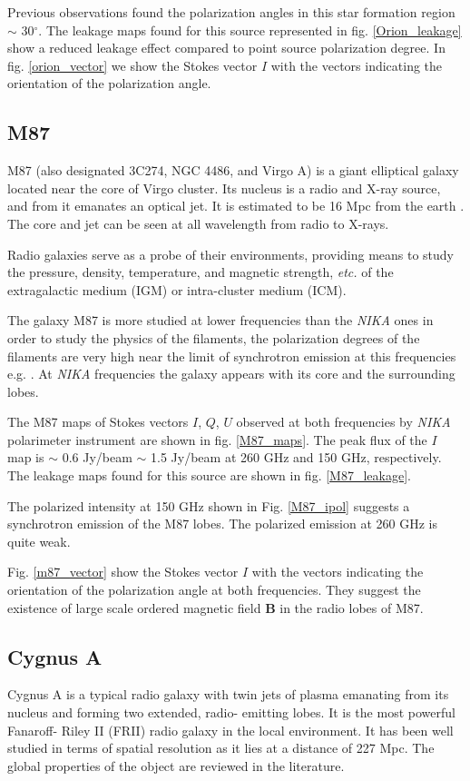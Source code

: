 \documentclass[twocolumn,traditabstract]{aa}
\begin{document}
Previous observations \citep{polka_apex} found the polarization angles in this star formation region $\sim$ 30$^\circ$.
The leakage maps found for this source represented in fig. \ref{Orion_leakage} show a reduced leakage effect compared to point source polarization degree. In fig. \ref{orion_vector} we show the Stokes vector $I$ with the vectors indicating the orientation of the polarization angle.

 
\subsection{M87}
M87 (also designated 3C274, NGC 4486, and Virgo A) is a giant
elliptical galaxy \citep{dev76} located near the 
core of Virgo cluster. 
Its nucleus is a radio and X-ray source, and from it emanates an
optical jet. It is estimated to be 16 Mpc from the earth \citep{mou80}. The core and jet can be seen at all wavelength 
from radio to X-rays.

Radio galaxies serve as a probe of their environments, providing means
to study the pressure, density, temperature, and magnetic strength, {\it
etc.} of the extragalactic medium (IGM) or intra-cluster
medium (ICM). 

The galaxy M87 is more studied at lower frequencies than the {\it NIKA} ones in order to study the physics of the filaments, the polarization 
degrees of the filaments are very high near the limit of synchrotron 
emission at this frequencies e.g. \citep{pac70}. At {\it NIKA} frequencies the galaxy appears with its core and the surrounding lobes. 

The M87 maps of Stokes vectors $I$, $Q$, $U$ observed at both frequencies by {\it NIKA} polarimeter instrument are shown in fig. \ref{M87_maps}. The peak flux of the $I$ map is $\sim$ 0.6 Jy/beam $\sim$ 1.5 Jy/beam at 260 GHz and 150 GHz, respectively. The leakage maps found for this source are shown in fig. \ref{M87_leakage}. 

The polarized intensity at 150 GHz shown in Fig. \ref{M87_ipol} suggests a synchrotron emission of the M87 lobes.  The polarized emission at 260 GHz is quite weak. 

 Fig. \ref{m87_vector} show the Stokes vector $I$ with the vectors indicating the orientation of the polarization angle at both frequencies.  They suggest the existence of  large scale ordered magnetic field {\bf B} in the radio lobes of M87.

\subsection{Cygnus A}
Cygnus A is a typical radio galaxy with twin jets of plasma emanating from its nucleus and forming two extended, radio- emitting lobes. 
It is  the most powerful Fanaroff- Riley II (FRII) radio galaxy in the local environment.
It has been well studied in terms of spatial resolution as it lies
at a distance of 227 Mpc. The global properties of the object are
reviewed in the literature.  
\end{document}
